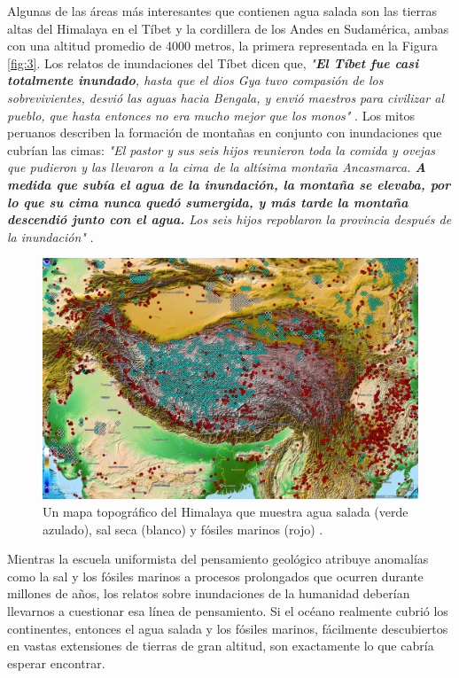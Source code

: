 \documentclass[10pt,twocolumn,letterpaper]{article}
\begin{document}
Algunas de las áreas más interesantes que contienen agua salada son las tierras altas del Himalaya en el Tíbet y la cordillera de los Andes en Sudamérica, ambas con una altitud promedio de 4000 metros, la primera representada en la Figura \ref{fig:3}. Los relatos de inundaciones del Tíbet dicen que, \textit{"\textbf{El Tíbet fue casi totalmente inundado}, hasta que el dios Gya tuvo compasión de los sobrevivientes, desvió las aguas hacia Bengala, y envió maestros para civilizar al pueblo, que hasta entonces no era mucho mejor que los monos"} \cite{3}. Los mitos peruanos describen la formación de montañas en conjunto con inundaciones que cubrían las cimas: \textit{"El pastor y sus seis hijos reunieron toda la comida y ovejas que pudieron y las llevaron a la cima de la altísima montaña Ancasmarca. \textbf{A medida que subía el agua de la inundación, la montaña se elevaba, por lo que su cima nunca quedó sumergida, y más tarde la montaña descendió junto con el agua.} Los seis hijos repoblaron la provincia después de la inundación"} \cite{3}.

\begin{figure}[t]
\begin{center}
   \includegraphics[width=1\linewidth]{tibet.jpg}
\end{center}
   \caption{Un mapa topográfico del Himalaya que muestra agua salada (verde azulado), sal seca (blanco) y fósiles marinos (rojo) \cite{15,16,86,87}.}
\label{fig:3}
\label{fig:onecol}
\end{figure}

Mientras la escuela uniformista del pensamiento geológico atribuye anomalías como la sal y los fósiles marinos a procesos prolongados que ocurren durante millones de años, los relatos sobre inundaciones de la humanidad deberían llevarnos a cuestionar esa línea de pensamiento. Si el océano realmente cubrió los continentes, entonces el agua salada y los fósiles marinos, fácilmente descubiertos en vastas extensiones de tierras de gran altitud, son exactamente lo que cabría esperar encontrar.
\end{document}
